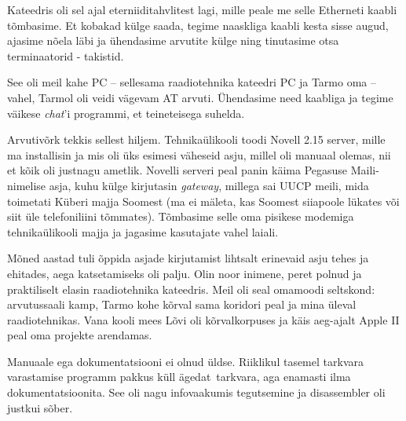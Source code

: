 Kateedris oli sel ajal eterniiditahvlitest lagi, mille peale me selle Etherneti kaabli tõmbasime. Et kobakad külge saada, tegime
naaskliga kaabli kesta sisse augud, ajasime nõela läbi ja ühendasime
arvutite külge ning tinutasime otsa terminaatorid - takistid. 


See oli meil kahe PC -- sellesama raadiotehnika kateedri PC ja Tarmo oma -- vahel, Tarmol oli 
veidi vägevam AT arvuti. Ühendasime need 
kaabliga ja tegime väikese 
\emph{chat}'i programmi, et teineteisega suhelda. 

Arvutivõrk tekkis sellest hiljem. Tehnikaülikooli toodi Novell 2.15 
server, mille ma installisin ja mis oli üks esimesi väheseid asju, millel oli manuaal 
olemas, nii et kõik oli justnagu ametlik. Novelli serveri peal panin käima Pegasuse 
Maili-nimelise asja, kuhu külge kirjutasin \emph{gateway}, 
millega sai UUCP meili, mida toimetati Küberi 
majja Soomest (ma ei mäleta, kas Soomest siiapoole lükates või siit 
üle telefoniliini tõmmates). Tõmbasime selle oma pisikese modemiga 
tehnikaülikooli majja ja jagasime kasutajate vahel laiali.


Mõned aastad tuli õppida asjade kirjutamist lihtsalt erinevaid asju tehes ja ehitades, aega katsetamiseks oli palju. 
Olin noor inimene, peret polnud ja praktiliselt elasin raadiotehnika 
kateedris. Meil oli seal omamoodi seltskond: arvutussaali 
kamp, Tarmo kohe kõrval sama 
koridori peal ja mina üleval raadiotehnikas. Vana kooli mees 
Lõvi oli kõrvalkorpuses ja käis aeg-ajalt Apple II peal 
oma projekte arendamas.


Manuaale ega dokumentatsiooni ei olnud üldse. Riiklikul 
tasemel tarkvara varastamise programm pakkus küll ägedat tarkvara, aga 
enamasti ilma dokumentatsioonita. See oli nagu infovaakumis 
tegutsemine ja disassembler oli justkui sõber.

